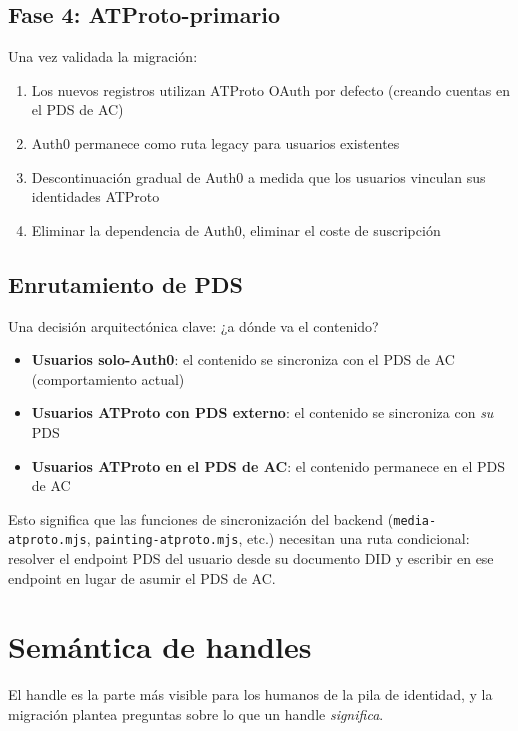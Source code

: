 \documentclass[10pt,letterpaper,twocolumn]{article}
\begin{document}
\subsection{Fase 4: ATProto-primario}

Una vez validada la migración:

\begin{enumerate}
  \item Los nuevos registros utilizan ATProto OAuth por defecto (creando cuentas en el PDS de AC)
  \item Auth0 permanece como ruta legacy para usuarios existentes
  \item Descontinuación gradual de Auth0 a medida que los usuarios vinculan sus identidades ATProto
  \item Eliminar la dependencia de Auth0, eliminar el coste de suscripción
\end{enumerate}

\subsection{Enrutamiento de PDS}

Una decisión arquitectónica clave: ¿a dónde va el contenido?

\begin{itemize}
  \item \textbf{Usuarios solo-Auth0}: el contenido se sincroniza con el PDS de AC (comportamiento actual)
  \item \textbf{Usuarios ATProto con PDS externo}: el contenido se sincroniza con \emph{su} PDS
  \item \textbf{Usuarios ATProto en el PDS de AC}: el contenido permanece en el PDS de AC
\end{itemize}

Esto significa que las funciones de sincronización del backend (\texttt{media-atproto.mjs}, \texttt{painting-atproto.mjs}, etc.) necesitan una ruta condicional: resolver el endpoint PDS del usuario desde su documento DID y escribir en ese endpoint en lugar de asumir el PDS de AC.


\section{Semántica de handles}
\label{sec:handles}

El handle es la parte más visible para los humanos de la pila de identidad, y la migración plantea preguntas sobre lo que un handle \emph{significa}.
\end{document}
